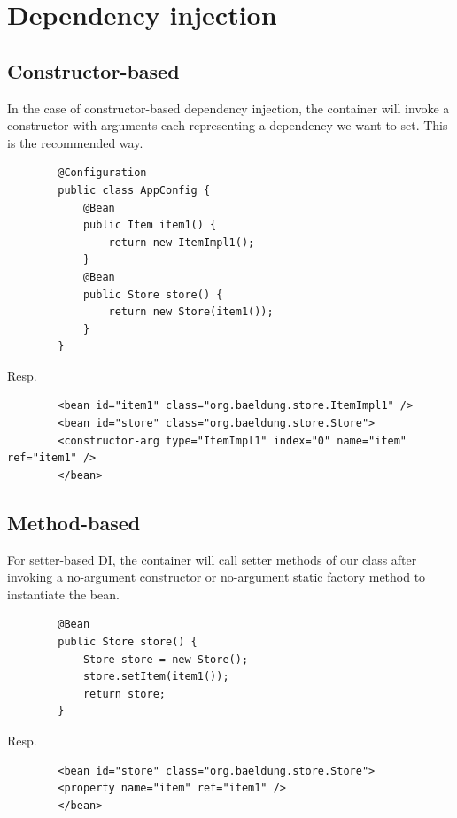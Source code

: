 \documentclass{scrartcl}
\begin{document}
\section{Dependency injection}
\subsection{Constructor-based}

    In the case of constructor-based dependency injection, the container will invoke a constructor with arguments each representing a dependency we want to set.
    This is the recommended way.

    \begin{lstlisting}
        @Configuration
        public class AppConfig {
            @Bean
            public Item item1() {
                return new ItemImpl1();
            }
            @Bean
            public Store store() {
                return new Store(item1());
            }
        }
    \end{lstlisting}

    Resp.

    \begin{lstlisting}
        <bean id="item1" class="org.baeldung.store.ItemImpl1" />
        <bean id="store" class="org.baeldung.store.Store">
        <constructor-arg type="ItemImpl1" index="0" name="item" ref="item1" />
        </bean>
    \end{lstlisting}

\subsection{Method-based}

    For setter-based DI, the container will call setter methods of our class after invoking a no-argument constructor or no-argument static factory method to instantiate the bean.

    \begin{lstlisting}
        @Bean
        public Store store() {
            Store store = new Store();
            store.setItem(item1());
            return store;
        }
    \end{lstlisting}

    Resp.

    \begin{lstlisting}
        <bean id="store" class="org.baeldung.store.Store">
        <property name="item" ref="item1" />
        </bean>
    \end{lstlisting}
\end{document}
